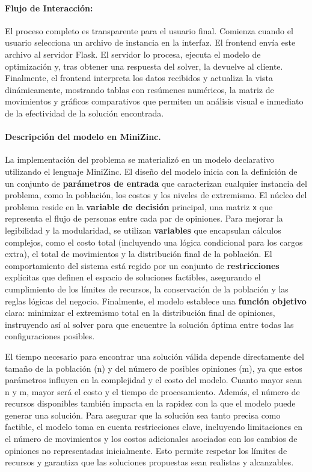 \documentclass[11pt,letter]{article}
\begin{document}
\paragraph{Flujo de Interacción:} El proceso completo es transparente para el usuario final. Comienza cuando el usuario selecciona un archivo de instancia en la interfaz. El frontend envía este archivo al servidor Flask. El servidor lo procesa, ejecuta el modelo de optimización y, tras obtener una respuesta del solver, la devuelve al cliente. Finalmente, el frontend interpreta los datos recibidos y actualiza la vista dinámicamente, mostrando tablas con resúmenes numéricos, la matriz de movimientos y gráficos comparativos que permiten un análisis visual e inmediato de la efectividad de la solución encontrada.

\paragraph{Descripción del modelo en MiniZinc.}
La implementación del problema se materializó en un modelo declarativo utilizando el lenguaje MiniZinc. El diseño del modelo inicia con la definición de un conjunto de \textbf{parámetros de entrada} que caracterizan cualquier instancia del problema, como la población, los costos y los niveles de extremismo. El núcleo del problema reside en la \textbf{variable de decisión} principal, una matriz \texttt{x} que representa el flujo de personas entre cada par de opiniones. Para mejorar la legibilidad y la modularidad, se utilizan \textbf{variables} que encapsulan cálculos complejos, como el costo total (incluyendo una lógica condicional para los cargos extra), el total de movimientos y la distribución final de la población. El comportamiento del sistema está regido por un conjunto de \textbf{restricciones} explícitas que definen el espacio de soluciones factibles, asegurando el cumplimiento de los límites de recursos, la conservación de la población y las reglas lógicas del negocio. Finalmente, el modelo establece una \textbf{función objetivo} clara: minimizar el extremismo total en la distribución final de opiniones, instruyendo así al solver para que encuentre la solución óptima entre todas las configuraciones posibles.


\begin{tcolorbox}[colback=green!5!white, colframe=green!50!black, title=Factibilidad y Escalabilidad de la Solución]
El tiempo necesario para encontrar una solución válida depende directamente del tamaño de la población (n) y del número de posibles opiniones (m), ya que estos parámetros influyen en la complejidad y el costo del modelo. Cuanto mayor sean n y m, mayor será el costo y el tiempo de procesamiento. Además, el número de recursos disponibles también impacta en la rapidez con la que el modelo puede generar una solución. Para asegurar que la solución sea tanto precisa como factible, el modelo toma en cuenta restricciones clave, incluyendo limitaciones en el número de movimientos y los costos adicionales asociados con los cambios de opiniones no representadas inicialmente. Esto permite respetar los límites de recursos y garantiza que las soluciones propuestas sean realistas y alcanzables.
        \end{tcolorbox}
\end{document}
